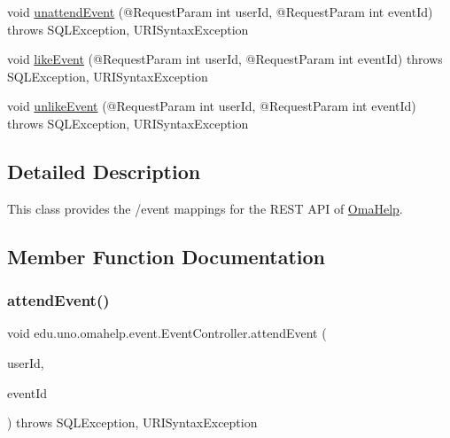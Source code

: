 \begin{DoxyCompactItemize}
\item 
void \mbox{\hyperlink{classedu_1_1uno_1_1omahelp_1_1event_1_1_event_controller_ac6ce265c776c82ca7e1b56c911267da8}{unattend\+Event}} (@Request\+Param int user\+Id, @Request\+Param int event\+Id)  throws S\+Q\+L\+Exception, U\+R\+I\+Syntax\+Exception 
\item 
void \mbox{\hyperlink{classedu_1_1uno_1_1omahelp_1_1event_1_1_event_controller_a7fd1113ad27e4a32243168bd4c2f19c7}{like\+Event}} (@Request\+Param int user\+Id, @Request\+Param int event\+Id)  throws S\+Q\+L\+Exception, U\+R\+I\+Syntax\+Exception 
\item 
void \mbox{\hyperlink{classedu_1_1uno_1_1omahelp_1_1event_1_1_event_controller_af352df6963751f721b1e25c57aba36c8}{unlike\+Event}} (@Request\+Param int user\+Id, @Request\+Param int event\+Id)  throws S\+Q\+L\+Exception, U\+R\+I\+Syntax\+Exception 
\end{DoxyCompactItemize}


\subsection{Detailed Description}
This class provides the /event mappings for the R\+E\+ST A\+PI of \mbox{\hyperlink{classedu_1_1uno_1_1omahelp_1_1_oma_help}{Oma\+Help}}. 

\subsection{Member Function Documentation}
\mbox{\label{classedu_1_1uno_1_1omahelp_1_1event_1_1_event_controller_aeb967fdf80fb5b9547c2dc360e8ab8c1}} 
\subsubsection{\texorpdfstring{attend\+Event()}{attendEvent()}}
{\footnotesize\ttfamily void edu.\+uno.\+omahelp.\+event.\+Event\+Controller.\+attend\+Event (\begin{DoxyParamCaption}\item[{@Request\+Param int}]{user\+Id,  }\item[{@Request\+Param int}]{event\+Id }\end{DoxyParamCaption}) throws S\+Q\+L\+Exception, U\+R\+I\+Syntax\+Exception}

